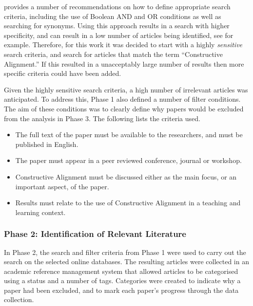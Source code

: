 \citet{Kitchenham:2004} provides a number of recommendations on how to define appropriate search criteria, including the use of Boolean AND and OR conditions as well as searching for synonyms. Using this approach results in a search with higher specificity, and can result in a low number of articles being identified, see \citet{Salleh:2011} for example. Therefore, for this work it was decided to start with a highly \emph{sensitive} search criteria, and search for articles that match the term ``Constructive Alignment.'' If this resulted in a unacceptably large number of results then more specific criteria could have been added.

Given the highly sensitive search criteria, a high number of irrelevant articles was anticipated. To address this, Phase 1 also defined a number of filter conditions. The aim of these conditions was to clearly define why papers would be excluded from the analysis in Phase 3. The following lists the criteria used.

\begin{itemize}[noitemsep,nolistsep]
	\item The full text of the paper must be available to the researchers, and must be published in English.
	\item The paper must appear in a peer reviewed conference, journal or workshop.
	\item Constructive Alignment must be discussed either as the main focus, or an important aspect, of the paper.
	\item Results must relate to the use of Constructive Alignment in a teaching and learning context.
\end{itemize}


\subsubsection{Phase 2: Identification of Relevant Literature} %
\label{ssub:identification_of_relevant_literature}

In Phase 2, the search and filter criteria from Phase 1 were used to carry out the search on the selected online databases. The resulting articles were collected in an academic reference management system that allowed articles to be categorised using a status and a number of tags. Categories were created to indicate why a paper had been excluded, and to mark each paper's progress through the data collection. 

